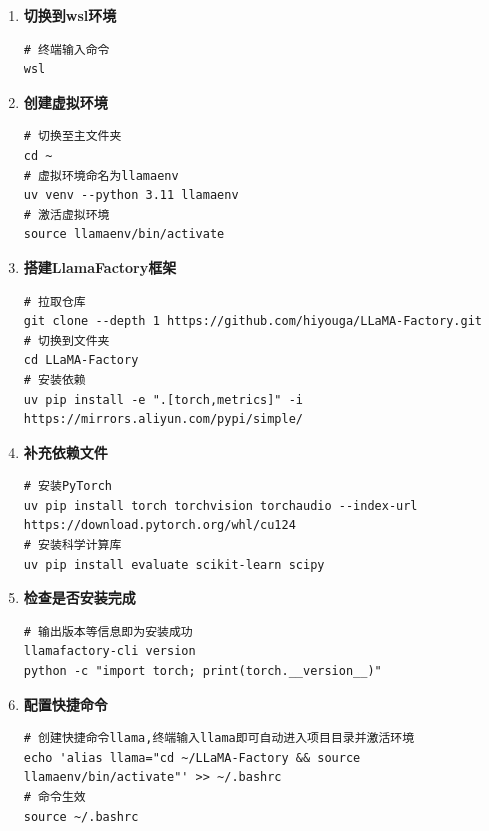 \documentclass[12pt]{ctexart}
\begin{document}
\begin{enumerate}

    \item \textbf{切换到wsl环境}

          \begin{lstlisting}
# 终端输入命令
wsl
          \end{lstlisting}

    \item \textbf{创建虚拟环境}

          \begin{lstlisting}
# 切换至主文件夹
cd ~
# 虚拟环境命名为llamaenv
uv venv --python 3.11 llamaenv
# 激活虚拟环境
source llamaenv/bin/activate
          \end{lstlisting}

    \item \textbf{搭建LlamaFactory框架}

          \begin{lstlisting}
# 拉取仓库
git clone --depth 1 https://github.com/hiyouga/LLaMA-Factory.git
# 切换到文件夹
cd LLaMA-Factory
# 安装依赖
uv pip install -e ".[torch,metrics]" -i https://mirrors.aliyun.com/pypi/simple/
          \end{lstlisting}

    \item \textbf{补充依赖文件}

          \begin{lstlisting}
# 安装PyTorch
uv pip install torch torchvision torchaudio --index-url https://download.pytorch.org/whl/cu124
# 安装科学计算库
uv pip install evaluate scikit-learn scipy
          \end{lstlisting}

    \item \textbf{检查是否安装完成}

          \begin{lstlisting}
# 输出版本等信息即为安装成功
llamafactory-cli version
python -c "import torch; print(torch.__version__)"
          \end{lstlisting}

    \item \textbf{配置快捷命令}

          \begin{lstlisting}
# 创建快捷命令llama,终端输入llama即可自动进入项目目录并激活环境
echo 'alias llama="cd ~/LLaMA-Factory && source llamaenv/bin/activate"' >> ~/.bashrc
# 命令生效
source ~/.bashrc
          \end{lstlisting}


\end{enumerate}
\end{document}

